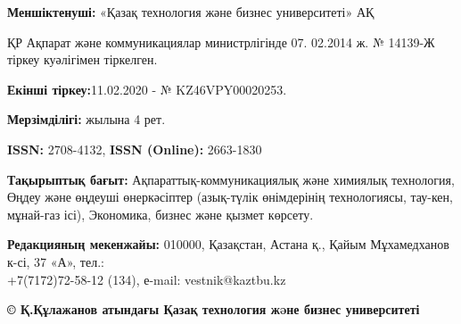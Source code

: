 {\textbf{Меншіктенуші:} «Қазақ технология және бизнес университеті» АҚ

ҚР Ақпарат және коммуникациялар министрлігінде 07. 02.2014 ж. № 14139-Ж тіркеу куәлігімен тіркелген.

\textbf{Екінші тіркеу:}11.02.2020 - № KZ46VPY00020253.

\textbf{Мерзімділігі:} жылына 4 рет.

\textbf{ISSN:} 2708-4132, \textbf{ISSN (Online):} 2663-1830

\textbf{Тақырыптық бағыт:} Ақпараттық-коммуникациялық және химиялық
технология, Өңдеу және өңдеуші өнеркәсіптер (азық-түлік өнімдерінің
технологиясы, тау-кен, мұнай-газ ісі), Экономика, бизнес және қызмет көрсету.

\textbf{Редакцияның мекенжайы:} 010000, Қазақстан, Астана қ., Қайым
Мұхамедханов к-сі, 37 «А», тел.: \\+7(7172)72-58-12 (134), е-mail:
vestnik@kaztbu.kz
\vfill
\begin{center}
\textbf{\normalsize © Қ.Құлажанов атындағы Қазақ технология жəне бизнес университеті}
\end{center}
}

